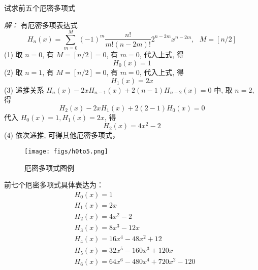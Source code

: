 \begin{example}
	试求前五个厄密多项式
	\end{example}
   \emph{解：}
	有厄密多项表达式
		\begin{equation*}
			H_n(x) =\sum_{m=0}^{M}  (-1)^m \frac{n! } {  m ! (n-2m)!}  2^{n-2m} x^{n-2m} ,  ~~~ M=[n/2]
		\end{equation*} 
	(1) 取 $n=0$, 有 $M=[n/2] =0$, 有 $m=0$, 代入上式, 得 
	\[H_0 (x) = 1\]  
	(2) 取 $n=1$, 有 $M=[n/2] =0$, 有 $m=0$, 代入上式, 得 
	\[H_1 (x) = 2x\] 
	(3) 递推关系 $H_{n}(x) -2xH_{n-1}(x) +2(n-1)H_{n-2} (x) =0$ 中, 取 $n=2$, 得
	$$H_{2}(x) -2xH_{1}(x) +2(2-1)H_{0} (x) =0 $$ 
	代入 $H_0 (x) = 1, H_1 (x) = 2x$, 得 
	\[H_2 (x) = 4x^2 -2 \] 
	(4) 依次递推, 可得其他厄密多项式，
\begin{figure}[h]
   \centering
   \texttt{[image: figs/h0to5.png]}
   \caption{厄密多项式图例}
\end{figure}
前七个厄密多项式具体表达为：
$$
\begin{aligned}
   & H_0(x)=1 \\
   & H_1(x)=2 x \\
   & H_2(x)=4 x^2-2 \\
   & H_3(x)=8 x^3-12 x \\
   & H_4(x)=16 x^4-48 x^2+12 \\
   & H_5(x)=32 x^5-160 x^3+120 x \\
   & H_6(x)=64 x^6-480 x^4+720 x^2-120
   \end{aligned}
   $$


	~~\\ 

